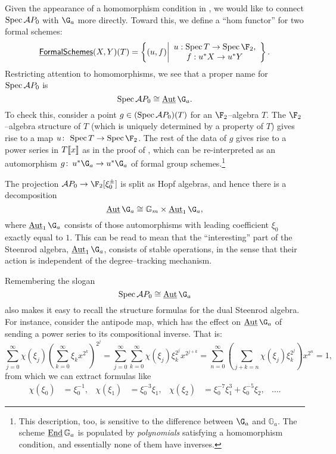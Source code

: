 \begin{example}\label{FirstAppearanceOfInternalAut}
Given the appearance of a homomorphism condition in , we would like to connect $\operatorname{Spec} \mathcal AP_0$ with $\G_a$ more directly.  Toward this, we define a ``hom functor'' for two formal schemes: \[\InternalHom{FormalSchemes}(X, Y)(T) = \left\{ (u, f) \middle| \begin{array}{c} u: \Spec T \to \Spec \F_2, \\ f: u^* X \to u^* Y \end{array}\right\}.\]  Restricting attention to homomorphisms, we see that a proper name for $\operatorname{Spec} \mathcal AP_0$ is \[\Spec \mathcal AP_0 \cong \InternalAut \G_a.\]  To check this, consider a point $g \in (\operatorname{Spec} \mathcal AP_0)(T)$ for an $\F_2$--algebra $T$.  The $\F_2$--algebra structure of $T$ (which is uniquely determined by a property of $T$) gives rise to a map $u\co \Spec T \to \Spec \F_2$.  The rest of the data of $g$ gives rise to a power series in $T\llbracket{x}\rrbracket$ as in the proof of , which can be re-interpreted as an automorphism $g\co u^* \G_a \to u^* \G_a$ of formal group schemes.\footnote{This description, too, is sensitive to the difference between $\G_a$ and $\mathbb G_a$.  The scheme $\operatorname{\underline{\smash{\operatorname{End}}}} \mathbb G_a$ is populated by \emph{polynomials} satisfying a homomorphism condition, and essentially none of them have inverses.}
\end{example}

\begin{remark}\label{AutGaHasStableCoopns}
The projection $\mathcal AP_0 \to \F_2[\xi_0^\pm]$ is split as Hopf algebras, and hence there is a decomposition \[\InternalAut \G_a \cong \Gm \times \InternalAut_1 \G_a,\] where $\InternalAut_1 \G_a$ consists of those automorphisms with leading coefficient $\xi_0$ exactly equal to $1$.  This can be read to mean that the ``interesting'' part of the Steenrod algebra, $\InternalAut_1 \G_a$, consists of stable operations, in the sense that their action is independent of the degree--tracking mechanism.
\end{remark}

\begin{example}
Remembering the slogan \[\Spec \mathcal AP_0 \cong \InternalAut \G_a\] also makes it easy to recall the structure formulas for the dual Steenrod algebra.  For instance, consider the antipode map, which has the effect on $\InternalAut \G_a$ of sending a power series to its compositional inverse.  That is: \[\sum_{j=0}^\infty \chi(\xi_j) \left( \sum_{k=0}^\infty \xi_k x^{2^k} \right)^{2^j} = \sum_{j=0}^\infty \sum_{k=0}^\infty \chi(\xi_j) \xi_k^{2^j} x^{2^{j+k}} = \sum_{n=0}^\infty \left( \sum_{j+k=n} \chi(\xi_j) \xi_k^{2^j} \right) x^{2^n} = 1,\] from which we can extract formulas like
\begin{align*}
\chi(\xi_0) & = \xi_0^{-1}, &
\chi(\xi_1) & = \xi_0^{-3} \xi_1, &
\chi(\xi_2) & = \xi_0^{-7} \xi_1^3 + \xi_0^{-5} \xi_2, &
\ldots.
\end{align*}
\end{example}

